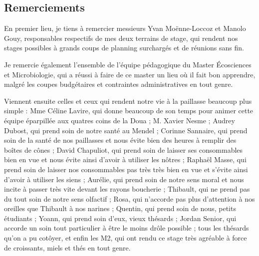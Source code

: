\rmfamily
{}

\blankpage

\subsection*{Remerciements}

En premier lieu, je tiens à remercier messieurs Yvan Moënne-Loccoz et Manolo
Gouy, responsables respectifs de mes deux terrains de stage, qui rendent nos
stages possibles à grands coups de planning surchargés et de réunions sans fin.

Je remercie également l'ensemble de l'équipe pédagogique du Master Écosciences
et Microbiologie, qui a réussi à faire de ce master un lieu où il fait bon
apprendre, malgré les coupes budgétaires et contraintes administratives en tout
genre.

Viennent ensuite celles et ceux qui rendent notre vie à la paillasse beaucoup
plus simple : Mme Céline Lavire, qui donne beaucoup de son temps pour animer
cette équipe éparpillée aux quatres coins de la Doua ; M. Xavier Nesme ; Audrey
Dubost, qui prend soin de notre santé au Mendel ; Corinne Sannaire, qui prend
soin de la santé de nos paillasses et nous évite bien des heures à remplir des
boîtes de cônes ; David Chapuliot, qui prend soin de laisser ses consommables
bien en vue et nous évite ainsi d'avoir à utiliser les nôtres ; Raphaël Masse,
qui prend soin de laisser nos consommables pas très très bien en vue et s'évite
ainsi d'avoir à utiliser les siens ; Aurélie, qui prend soin de notre sens moral
et nous incite à passer très vite devant les rayons boucherie ; Thibault, qui ne
prend pas du tout soin de notre sens olfactif ; Rosa, qui n'accorde pas plus
d'attention à nos oreilles que Thibault à nos narines ; Quentin, qui prend soin
de nous, petits étudiants ; Yoann, qui prend soin d'eux, vieux thésards ; Jordan
Senior, qui accorde un soin tout particulier à être le moins drôle possible ;
tous les thésards qu'on a pu cotôyer, et enfin les M2, qui ont rendu ce stage
très agréable à force de croissants, miels et thés en tout genre.

